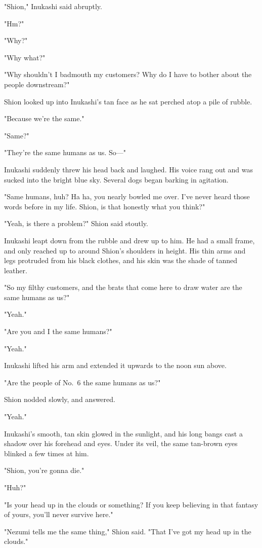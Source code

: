 "Shion," Inukashi said abruptly.

"Hm?"

"Why?"

"Why what?"

"Why shouldn't I badmouth my customers? Why do I have to bother about
the people downstream?"

Shion looked up into Inukashi's tan face as he sat perched atop a pile
of rubble.

"Because we're the same."

"Same?"

"They're the same humans as us. So---"

Inukashi suddenly threw his head back and laughed. His voice rang out
and was sucked into the bright blue sky. Several dogs began barking in
agitation.

"Same humans, huh? Ha ha, you nearly bowled me over. I've never heard
those words before in my life. Shion, is that honestly what you think?"

"Yeah, is there a problem?" Shion said stoutly.

Inukashi leapt down from the rubble and drew up to him. He had a small
frame, and only reached up to around Shion's shoulders in height. His
thin arms and legs protruded from his black clothes, and his skin was
the shade of tanned leather.

"So my filthy customers, and the brats that come here to draw water are
the same humans as us?"

"Yeah."

"Are you and I the same humans?"

"Yeah."

Inukashi lifted his arm and extended it upwards to the noon sun above.

"Are the people of No.~6 the same humans as us?"

Shion nodded slowly, and answered.

"Yeah."

Inukashi's smooth, tan skin glowed in the sunlight, and his long bangs
cast a shadow over his forehead and eyes. Under its veil, the same
tan-brown eyes blinked a few times at him.

"Shion, you're gonna die."

"Huh?"

"Is your head up in the clouds or something? If you keep
believing in that fantasy of yours, you'll never survive here."

"Nezumi tells me the same thing," Shion said. "That I've got my head up
in the clouds."

